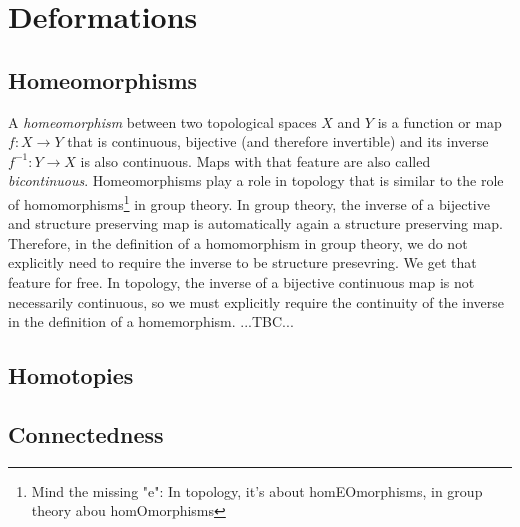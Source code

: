 \section{Deformations}


\subsection{Homeomorphisms}
A \emph{homeomorphism} between two topological spaces $X$ and $Y$ is a function or map $f: X \rightarrow Y$ that is continuous, bijective (and therefore invertible) and its inverse $f^{-1}: Y \rightarrow X$ is also continuous. Maps with that feature are also called \emph{bicontinuous}. Homeomorphisms play a role in topology that is similar to the role of homomorphisms\footnote{Mind the missing "e": In topology, it's about homEOmorphisms, in group theory abou homOmorphisms} in group theory. In group theory, the inverse of a bijective and structure preserving map is automatically again a structure preserving map. Therefore, in the definition of a homomorphism in group theory, we do not explicitly need to require the inverse to be structure presevring. We get that feature for free. In topology, the inverse of a bijective continuous map is not necessarily continuous, so we must explicitly require the continuity of the inverse in the definition of a homemorphism. ...TBC...




\subsection{Homotopies}


\subsection{Connectedness}

